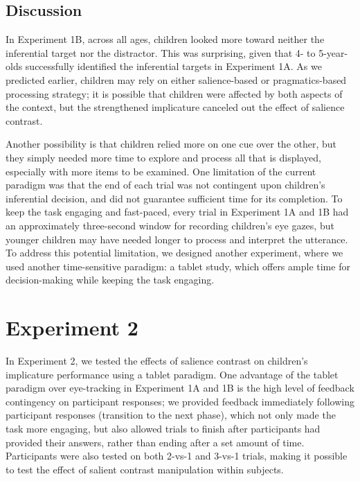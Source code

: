 \documentclass[a4paper,man,apacite,floatsintext]{apa6}
\begin{document}
\subsection{Discussion}\label{discussion-1}

In Experiment 1B, across all ages, children looked more toward neither
the inferential target nor the distractor. This was surprising, given
that 4- to 5-year-olds successfully identified the inferential targets
in Experiment 1A. As we predicted earlier, children may rely on either
salience-based or pragmatics-based processing strategy; it is possible
that children were affected by both aspects of the context, but the
strengthened implicature canceled out the effect of salience contrast.

Another possibility is that children relied more on one cue over the
other, but they simply needed more time to explore and process all that
is displayed, especially with more items to be examined. One limitation
of the current paradigm was that the end of each trial was not
contingent upon children's inferential decision, and did not guarantee
sufficient time for its completion. To keep the task engaging and
fast-paced, every trial in Experiment 1A and 1B had an approximately
three-second window for recording children's eye gazes, but younger
children may have needed longer to process and interpret the utterance.
To address this potential limitation, we designed another experiment,
where we used another time-sensitive paradigm: a tablet study, which
offers ample time for decision-making while keeping the task engaging.

\section{Experiment 2}\label{experiment-2}

In Experiment 2, we tested the effects of salience contrast on
children's implicature performance using a tablet paradigm. One
advantage of the tablet paradigm over eye-tracking in Experiment 1A and
1B is the high level of feedback contingency on participant responses;
we provided feedback immediately following participant responses
(transition to the next phase), which not only made the task more
engaging, but also allowed trials to finish after participants had
provided their answers, rather than ending after a set amount of time.
Participants were also tested on both 2-vs-1 and 3-vs-1 trials, making
it possible to test the effect of salient contrast manipulation within
subjects.
\end{document}
